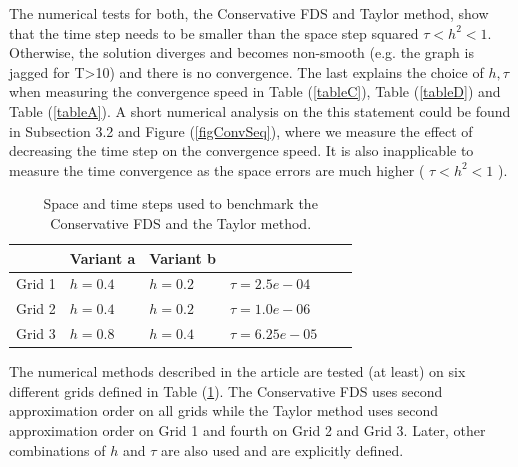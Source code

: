 \documentclass[%
 aip,
cp,  
 amsmath,amssymb,
 reprint,
]{iopconfser}
\newcommand{\rf}[1]{(\ref{#1})}
\begin{document}
The numerical tests for both, the Conservative FDS and Taylor method, show that the time step needs to be smaller than the space step squared $\tau < h^2 < 1$. Otherwise, the solution diverges and becomes non-smooth (e.g. the graph is jagged for T>10) and there is no convergence. The last explains the choice of $h, \tau$ when measuring the convergence speed in Table \rf{tableC}, Table \rf{tableD} and Table \rf{tableA}. A short numerical analysis on the this statement could be found in Subsection 3.2 and Figure \rf{figConvSeq}, where we measure the effect of decreasing the time step on the convergence speed. It is also inapplicable to measure the time convergence as the space errors are much higher ( $\tau < h^2 < 1$ ).

\begin{table}[ht]
\centering
\small
		\begin{tabular}{|c|l|l|l|l|l|}
			\hline
                               &           Variant a  &           Variant b     &     \\
			\hline
            Grid 1          &            $h=0.4$  &            $h=0.2$     &    $\tau = 2.5e-04$  \\
			\hline
           Grid 2         &            $h=0.4$  &   $h=0.2$  &    $\tau =1.0e-06$   \\   
   			\hline 
           Grid 3         &            $h=0.8$  &            $h=0.4$  &    $\tau =6.25e-05$   \\    
	   \hline
		\end{tabular}
	\caption{ Space and time steps used to benchmark the Conservative FDS and the Taylor method.}
	\label{gridsT}
\end{table}

The numerical methods described in the article are tested (at least) on six different grids defined in Table \rf{gridsT}. The Conservative FDS uses second approximation order on all grids while the Taylor method uses second approximation order on Grid 1 and fourth on Grid 2 and Grid 3. Later, other combinations of $h$ and $\tau$ are also used and are explicitly defined.
\end{document}
